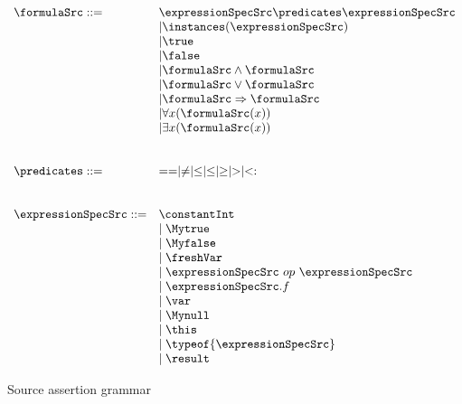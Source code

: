  
\begin{figure}[ht!]
\begin{frameit}
	$$
	\begin{array}{ll}
	\formulaSrc ::= & \expressionSpecSrc \predicates  \expressionSpecSrc \\
	  & \vert  \instances(\expressionSpecSrc)\\
	  & \vert \true \\
	  & \vert  \false \\	
	  & \vert \formulaSrc \wedge \formulaSrc \\
	  & \vert \formulaSrc \vee  \formulaSrc \\
	  & \vert \formulaSrc \Rightarrow \formulaSrc \\
	  & \vert \forall x  (  \formulaSrc(x) ) \\
	  & \vert \exists x  ( \formulaSrc (x))	 \\
      
          & \\
	  & \\
	  \predicates ::=  &   == \mid \neq \mid \leq \mid \le \mid \geq \mid > \mid  <: \\
	  & \\
	  & \\
	  \expressionSpecSrc  ::= & \constantInt  \\
	                          & \mid \Mytrue \\ 
	                          & \mid \Myfalse \\
	                          & \mid \freshVar \\
				  & \mid \expressionSpecSrc \ op \ \expressionSpecSrc \\  
				  & \mid \expressionSpecSrc.f \\
				  & \mid \var \\
  			          & \mid \Mynull  \\
				  & \mid \this \\
	                          & \mid \typeof{\expressionSpecSrc} \\
	                          & \mid \result
                                  
	\end{array}
	$$
\caption{\sc Source assertion grammar}
\label{formulasSrc:grammar}
\end{frameit}
\end{figure}

